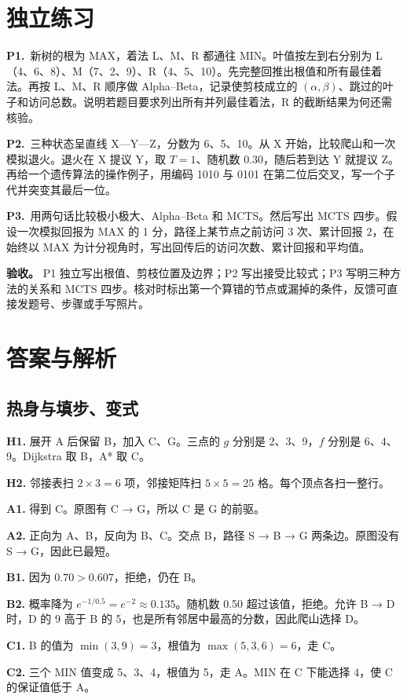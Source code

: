 \documentclass[UTF8,a4paper,11pt]{ctexart}
\newcommand{\PracticeQuestion}[3]{\par\Needspace{4\baselineskip}\noindent\begin{minipage}{\linewidth}\textbf{#1.}\ #2\par\noindent\rule{0pt}{#3mm}\par\end{minipage}\par}
\begin{document}
\section{独立练习}
\PracticeQuestion{P1}{新树的根为 MAX，着法 L、M、R 都通往 MIN。叶值按左到右分别为 L（4、6、8）、M（7、2、9）、R（4、5、10）。先完整回推出根值和所有最佳着法。再按 L、M、R 顺序做 Alpha–Beta，记录使剪枝成立的 $(\alpha,\beta)$、跳过的叶子和访问总数。说明若题目要求列出所有并列最佳着法，R 的截断结果为何还需核验。}{35}
\PracticeQuestion{P2}{三种状态呈直线 X—Y—Z，分数为 6、5、10。从 X 开始，比较爬山和一次模拟退火。退火在 X 提议 Y，取 $T=1$、随机数 0.30，随后若到达 Y 就提议 Z。再给一个遗传算法的操作例子，用编码 1010 与 0101 在第二位后交叉，写一个子代并突变其最后一位。}{35}
\PracticeQuestion{P3}{用两句话比较极小极大、Alpha–Beta 和 MCTS。然后写出 MCTS 四步。假设一次模拟回报为 MAX 的 1 分，路径上某节点之前访问 3 次、累计回报 2，在始终以 MAX 为计分视角时，写出回传后的访问次数、累计回报和平均值。}{35}
\textbf{验收。} P1 独立写出根值、剪枝位置及边界；P2 写出接受比较式；P3 写明三种方法的关系和 MCTS 四步。核对时标出第一个算错的节点或漏掉的条件，反馈可直接发题号、步骤或手写照片。

\clearpage
\section{答案与解析}
\subsection{热身与填步、变式}
\textbf{H1.} 展开 A 后保留 B，加入 C、G。三点的 $g$ 分别是 2、3、9，$f$ 分别是 6、4、9。Dijkstra 取 B，A* 取 C。

\textbf{H2.} 邻接表扫 $2\times3=6$ 项，邻接矩阵扫 $5\times5=25$ 格。每个顶点各扫一整行。

\textbf{A1.} 得到 C。原图有 C → G，所以 C 是 G 的前驱。

\textbf{A2.} 正向为 A、B，反向为 B、C。交点 B，路径 S → B → G 两条边。原图没有 S → G，因此已最短。

\textbf{B1.} 因为 $0.70>0.607$，拒绝，仍在 B。

\textbf{B2.} 概率降为 $e^{-1/0.5}=e^{-2}\approx0.135$。随机数 0.50 超过该值，拒绝。允许 B → D 时，D 的 9 高于 B 的 5，也是所有邻居中最高的分数，因此爬山选择 D。

\textbf{C1.} B 的值为 $\min(3,9)=3$，根值为 $\max(5,3,6)=6$，走 C。

\textbf{C2.} 三个 MIN 值变成 5、3、4，根值为 5，走 A。MIN 在 C 下能选择 4，使 C 的保证值低于 A。
\end{document}
